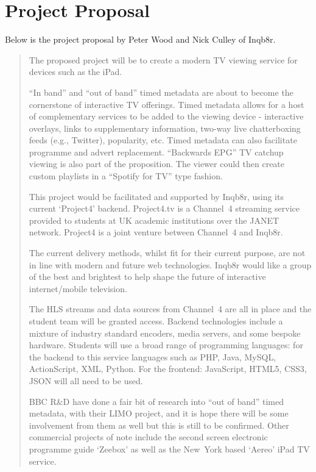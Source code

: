 \section{Project Proposal}
\label{sec:inqb8r_proposal}

Below is the project proposal by Peter Wood and Nick Culley of Inqb8r.

\begin{quotation}
\noindent The proposed project will be to create a modern TV viewing service for devices such as the iPad. 

``In band'' and ``out of band'' timed metadata are about to become the cornerstone of interactive TV offerings. Timed metadata allows for a host of complementary services to be added to the viewing device - interactive overlays, links to supplementary information, two-way live chatterboxing feeds (e.g., Twitter), popularity, etc. Timed metadata can also facilitate programme and advert replacement. ``Backwards EPG'' TV catchup viewing is also part of the proposition. The viewer could then create custom playlists in a ``Spotify for TV'' type fashion.  

This project would be facilitated and supported by Inqb8r, using its current `Project4' backend. Project4.tv is a Channel~4 streaming service provided to students at UK academic institutions over the JANET network. Project4 is a joint venture between Channel~4 and Inqb8r.

The current delivery methods, whilst fit for their current purpose, are not in line with modern and future web technologies. Inqb8r would like a group of the best and brightest to help shape the future of interactive internet/mobile television.

The HLS streams and data sources from Channel~4 are all in place and the student team will be granted access. Backend technologies include a mixture of industry standard encoders, media servers, and some bespoke hardware. Students will use a broad range of programming languages: for the backend to this service languages such as PHP, Java, MySQL, ActionScript, XML, Python. For the frontend: JavaScript, HTML5, CSS3, JSON will all need to be used.

BBC R\&D have done a fair bit of research into ``out of band'' timed metadata, with their LIMO project, and it is hope there will be some involvement from them as well but this is still to be confirmed. Other commercial projects of note include the second screen electronic programme guide `Zeebox' as well as the New~York based `Aereo' iPad TV service.


\end{quotation}
